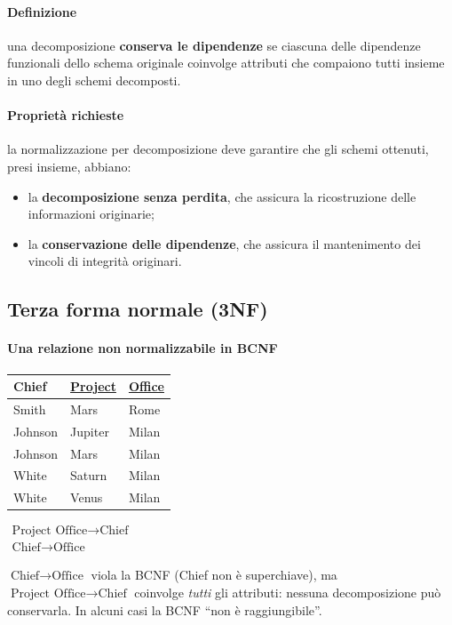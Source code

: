 \documentclass[a4paper,12pt]{article}
\begin{document}
\paragraph{Definizione} una decomposizione \textbf{conserva le dipendenze} se
ciascuna delle dipendenze funzionali dello schema originale coinvolge
attributi che compaiono tutti insieme in uno degli schemi decomposti.

\paragraph{Proprietà richieste} la normalizzazione per decomposizione deve
garantire che gli schemi ottenuti, presi insieme, abbiano:
\begin{itemize}
  \item la \textbf{decomposizione senza perdita}, che assicura la
    ricostruzione delle informazioni originarie;
  \item la \textbf{conservazione delle dipendenze}, che assicura il
    mantenimento dei vincoli di integrità originari.
\end{itemize}

\subsection{Terza forma normale (3NF)}

\paragraph{Una relazione non normalizzabile in BCNF}
\begin{center}
\begin{tabular}{|l|l|l|}
\hline
Chief & \underline{Project} & \underline{Office}\\ \hline
Smith & Mars & Rome\\ Johnson & Jupiter & Milan\\ Johnson & Mars & Milan\\
White & Saturn & Milan\\ White & Venus & Milan\\ \hline
\end{tabular}
\qquad
$\begin{array}{l}
\text{Project Office} \to \text{Chief}\\
\text{Chief} \to \text{Office}
\end{array}$
\end{center}
$\text{Chief} \to \text{Office}$ viola la BCNF (Chief non è superchiave), ma
$\text{Project Office} \to \text{Chief}$ coinvolge \emph{tutti} gli
attributi: nessuna decomposizione può conservarla. In alcuni casi la BCNF
``non è raggiungibile''.
\end{document}
